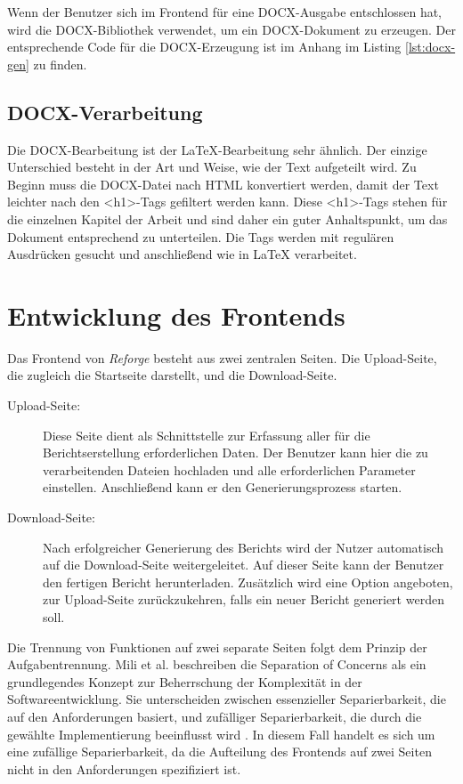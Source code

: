 Wenn der Benutzer sich im Frontend für eine \ac{DOCX}-Ausgabe entschlossen hat, wird die \ac{DOCX}-Bibliothek verwendet, um ein \ac{DOCX}-Dokument zu erzeugen. Der entsprechende Code für die \ac{DOCX}-Erzeugung ist im Anhang im Listing \ref{lst:docx-gen} zu finden. 

\subsection{DOCX-Verarbeitung}
Die \ac{DOCX}-Bearbeitung ist der LaTeX-Bearbeitung sehr ähnlich. Der einzige Unterschied besteht in der Art und Weise, wie der Text aufgeteilt wird. Zu Beginn muss die \ac{DOCX}-Datei nach \ac{HTML} konvertiert werden, damit der Text leichter nach den <h1>-Tags gefiltert werden kann. Diese <h1>-Tags stehen für die einzelnen Kapitel der Arbeit und sind daher ein guter Anhaltspunkt, um das Dokument entsprechend zu unterteilen. Die Tags werden mit regulären Ausdrücken gesucht und anschließend wie in LaTeX verarbeitet. 

\section{Entwicklung des Frontends}
Das Frontend von \textit{Reforge} besteht aus zwei zentralen Seiten. Die Upload-Seite, die zugleich die Startseite darstellt, und die Download-Seite.
\begin{description}
    \item[Upload-Seite:] 
    Diese Seite dient als Schnittstelle zur Erfassung aller für die Berichtserstellung erforderlichen Daten. Der Benutzer kann hier die zu verarbeitenden Dateien hochladen und alle erforderlichen Parameter einstellen. Anschließend kann er den Generierungsprozess starten.
    \item[Download-Seite:]
    Nach erfolgreicher Generierung des Berichts wird der Nutzer automatisch auf die Download-Seite weitergeleitet. Auf dieser Seite kann der Benutzer den fertigen Bericht herunterladen. Zusätzlich wird eine Option angeboten, zur Upload-Seite zurückzukehren, falls ein neuer Bericht generiert werden soll.
\end{description}
Die Trennung von Funktionen auf zwei separate Seiten folgt dem Prinzip der Aufgabentrennung. Mili et al. beschreiben die Separation of Concerns als ein grundlegendes Konzept zur Beherrschung der Komplexität in der Softwareentwicklung. Sie unterscheiden zwischen essenzieller Separierbarkeit, die auf den Anforderungen basiert, und zufälliger Separierbarkeit, die durch die gewählte Implementierung beeinflusst wird \cite[S.76]{mili2004understanding}. In diesem Fall handelt es sich um eine zufällige Separierbarkeit, da die Aufteilung des Frontends auf zwei Seiten nicht in den Anforderungen spezifiziert ist.

